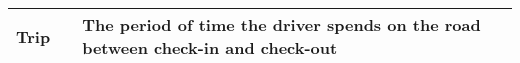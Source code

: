\begin{table}[H]
\begin{tabular}{| p{} | p{} | p{} |}
Trip  &  & The period of time the driver spends on the road between check-in and check-out \\ \hline

\end{tabular}



\end{table}
